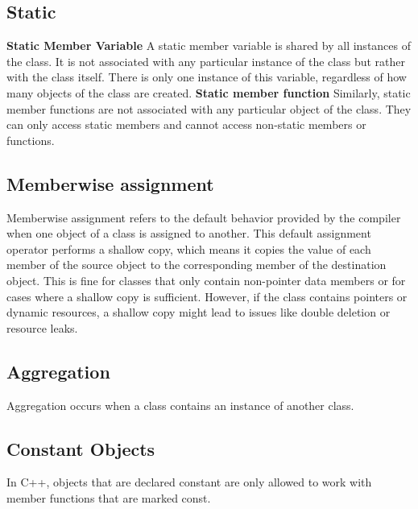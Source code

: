 \documentclass{report}
\begin{document}
    \bigbreak \noindent 
    \subsection{Static}
    \bigbreak \noindent 
    \begin{concept}
        \bigbreak \noindent 
        \textbf{Static Member Variable}
        \bigbreak \noindent 
       A static member variable is shared by all instances of the class. It is not associated with any particular instance of the class but rather with the class itself. There is only one instance of this variable, regardless of how many objects of the class are created. 
       \bigbreak \noindent 
       \textbf{Static member function}
       \bigbreak \noindent 
       Similarly, static member functions are not associated with any particular object of the class. They can only access static members and cannot access non-static members or functions.
    \end{concept}
    

    \bigbreak \noindent 
    \subsection{Memberwise assignment}
    \bigbreak \noindent 
    \begin{concept}
        Memberwise assignment refers to the default behavior provided by the compiler when one object of a class is assigned to another. This default assignment operator performs a shallow copy, which means it copies the value of each member of the source object to the corresponding member of the destination object. This is fine for classes that only contain non-pointer data members or for cases where a shallow copy is sufficient. However, if the class contains pointers or dynamic resources, a shallow copy might lead to issues like double deletion or resource leaks.
    \end{concept}


    \bigbreak \noindent 
    \subsection{Aggregation}
    \bigbreak \noindent 
    \begin{concept}
       Aggregation occurs when a class contains an instance of another class. 
    \end{concept}

    \bigbreak \noindent 
    \subsection{Constant Objects}
    \bigbreak \noindent 
    \begin{concept}
       In C++, objects that are declared constant are only allowed to work with member functions that are marked const. 
    \end{concept}
    
\end{document}
